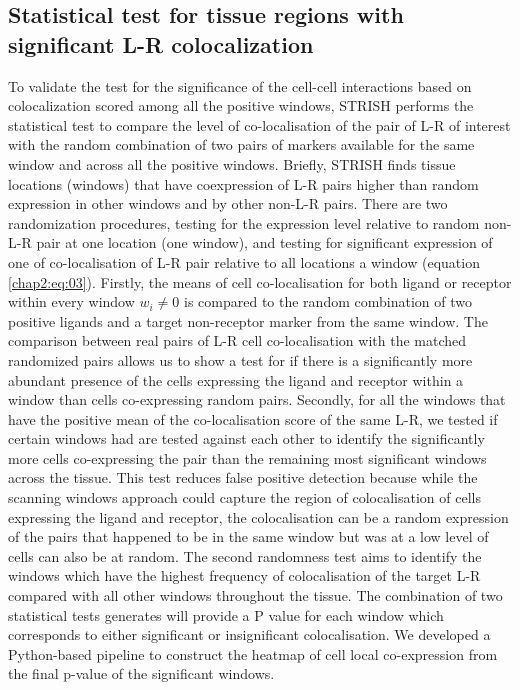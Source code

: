 \subsection{Statistical test for tissue regions with significant L-R colocalization}
To validate the test for the significance of the cell-cell interactions based on colocalization scored among all the positive windows, STRISH performs the statistical test to compare the level of co-localisation of the pair of L-R of interest with the random combination of two pairs of markers available for the same window and across all the positive windows. Briefly, STRISH finds tissue locations (windows) that have coexpression of L-R pairs higher than random expression in other windows and by other non-L-R pairs. There are two randomization procedures, testing for the expression level relative to random non-L-R pair at one location (one window), and testing for significant expression of one of co-localisation of L-R pair relative to all locations a window (equation \ref{chap2:eq:03}). Firstly, the means of cell co-localisation for both ligand or receptor within every window $w_i \neq 0$ is compared to the random combination of two positive ligands and a target non-receptor marker from the same window. The comparison between real pairs of L-R cell co-localisation with the matched randomized pairs allows us to show a test for if there is a significantly more abundant presence of the cells expressing  the ligand and receptor within a window than cells co-expressing random pairs. Secondly, for all the windows that have the positive mean of the co-localisation score of the same L-R, we tested if certain windows had  are tested against each other to identify the significantly more cells co-expressing the pair than the remaining  most significant windows across the tissue. This test reduces false positive detection because while the scanning windows approach could capture the region of colocalisation of cells expressing the ligand and receptor, the colocalisation can be a random expression of the pairs that happened to be in the same window but was at a low level of cells can also be at random. The second randomness test aims to identify the windows which have the highest frequency of colocalisation of the target L-R compared with all other windows throughout the tissue. The combination of two statistical tests generates will provide a P value for each window which corresponds to either significant or insignificant colocalisation. We developed a Python-based pipeline to construct the heatmap of cell local co-expression from the final p-value of the significant windows. 
